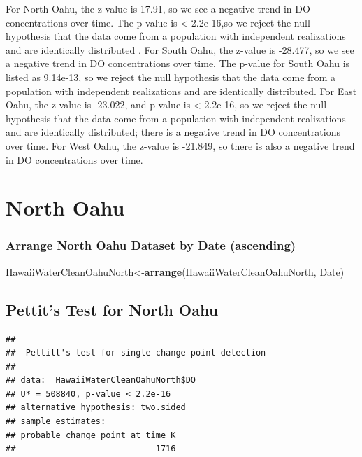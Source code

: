 \documentclass[12pt,]{article}
\newenvironment{Shaded}{\begin{snugshade}}{\end{snugshade}}
\newcommand{\KeywordTok}[1]{\textcolor[rgb]{0.13,0.29,0.53}{\textbf{#1}}}
\newcommand{\OperatorTok}[1]{\textcolor[rgb]{0.81,0.36,0.00}{\textbf{#1}}}
\newcommand{\NormalTok}[1]{#1}
\begin{document}
For North Oahu, the z-value is 17.91, so we see a negative trend in DO
concentrations over time. The p-value is \textless{} 2.2e-16,so we
reject the null hypothesis that the data come from a population with
independent realizations and are identically distributed . For South
Oahu, the z-value is -28.477, so we see a negative trend in DO
concentrations over time. The p-value for South Oahu is listed as
9.14e-13, so we reject the null hypothesis that the data come from a
population with independent realizations and are identically
distributed. For East Oahu, the z-value is -23.022, and p-value is
\textless{} 2.2e-16, so we reject the null hypothesis that the data come
from a population with independent realizations and are identically
distributed; there is a negative trend in DO concentrations over time.
For West Oahu, the z-value is -21.849, so there is also a negative trend
in DO concentrations over time.

\section{North Oahu}\label{north-oahu}

\subsubsection{Arrange North Oahu Dataset by Date
(ascending)}\label{arrange-north-oahu-dataset-by-date-ascending}

\begin{Shaded}
\begin{Highlighting}[]
\NormalTok{HawaiiWaterCleanOahuNorth<-}\KeywordTok{arrange}\NormalTok{(HawaiiWaterCleanOahuNorth, Date)}
\end{Highlighting}
\end{Shaded}

\subsection{Pettit's Test for North
Oahu}\label{pettits-test-for-north-oahu}

\begin{Shaded}
\end{Shaded}

\begin{verbatim}
## 
##  Pettitt's test for single change-point detection
## 
## data:  HawaiiWaterCleanOahuNorth$DO
## U* = 508840, p-value < 2.2e-16
## alternative hypothesis: two.sided
## sample estimates:
## probable change point at time K 
##                            1716
\end{verbatim}
\end{document}
